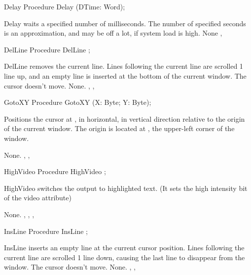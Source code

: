 \begin{procedure}{Delay}
\Declaration
Procedure Delay (DTime: Word);

\Description
Delay waits a specified number of milliseconds. The number of specified
seconds is an approximation, and may be off a lot, if system load is high.
\Errors
None
\SeeAlso
{}, 
\end{procedure}
\latex{}
 \html{}
\begin{procedure}{DelLine}
\Declaration
Procedure DelLine ;

\Description
 DelLine removes the current line. Lines following the current line are 
scrolled 1 line up, and an empty line is inserted at the bottom of the
current window. The cursor doesn't move.
\Errors
None.
\SeeAlso
{}, , 
\end{procedure}
\latex{}
 \html{}
\begin{procedure}{GotoXY}
\Declaration
Procedure GotoXY (X: Byte; Y: Byte);

\Description
 Positions the cursor at ,  in horizontal,  in
vertical direction relative to the origin of the current window. The origin
is located at , the upper-left corner of the window.

\Errors
None.
\SeeAlso
 , ,  
\end{procedure}
\latex{}
 \html{}
\begin{procedure}{HighVideo}
\Declaration
Procedure HighVideo ;

\Description
 HighVideo switches the output to highlighted text. (It sets the high
intensity bit of the video attribute)

\Errors
None.
\SeeAlso
 , , ,
\end{procedure}
\latex{}
 \html{}
\begin{procedure}{InsLine}
\Declaration
Procedure InsLine ;

\Description
 InsLine inserts an empty line at the current cursor position. 
Lines following the current line are scrolled 1 line down, 
causing the last line to disappear from the window. 
The cursor doesn't move.
\Errors
None.
\SeeAlso
{}, , 
\end{procedure}
